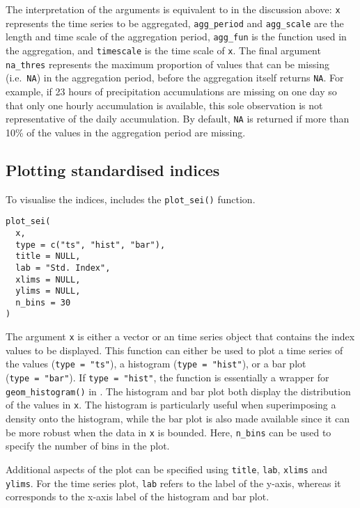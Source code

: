 The interpretation of the arguments is equivalent to in the discussion above: \texttt{x} represents the  time series to be aggregated, \texttt{agg\_period} and \texttt{agg\_scale} are the length and time scale of the aggregation period, \texttt{agg\_fun} is the function used in the aggregation, and \texttt{timescale} is the time scale of \texttt{x}. The final argument \texttt{na\_thres} represents the maximum proportion of values that can be missing (i.e.~\texttt{NA}) in the aggregation period, before the aggregation itself returns \texttt{NA}. For example, if 23 hours of precipitation accumulations are missing on one day so that only one hourly accumulation is available, this sole observation is not representative of the daily accumulation. By default, \texttt{NA} is returned if more than 10\% of the values in the aggregation period are missing.

\hypertarget{plotting-standardised-indices}{%
\subsection{Plotting standardised indices}\label{plotting-standardised-indices}}

To visualise the indices,  includes the \texttt{plot\_sei()} function.

\begin{verbatim}
plot_sei(
  x,
  type = c("ts", "hist", "bar"),
  title = NULL,
  lab = "Std. Index",
  xlims = NULL,
  ylims = NULL,
  n_bins = 30
)
\end{verbatim}

The argument \texttt{x} is either a vector or an  time series object that contains the index values to be displayed. This function can either be used to plot a time series of the values (\texttt{type\ =\ "ts"}), a histogram (\texttt{type\ =\ "hist"}), or a bar plot (\texttt{type\ =\ "bar"}). If \texttt{type\ =\ "hist"}, the function is essentially a wrapper for \texttt{geom\_histogram()} in . The histogram and bar plot both display the distribution of the values in \texttt{x}. The histogram is particularly useful when superimposing a density onto the histogram, while the bar plot is also made available since it can be more robust when the data in \texttt{x} is bounded. Here, \texttt{n\_bins} can be used to specify the number of bins in the plot.

Additional aspects of the plot can be specified using \texttt{title}, \texttt{lab}, \texttt{xlims} and \texttt{ylims}. For the time series plot, \texttt{lab} refers to the label of the y-axis, whereas it corresponds to the x-axis label of the histogram and bar plot.

